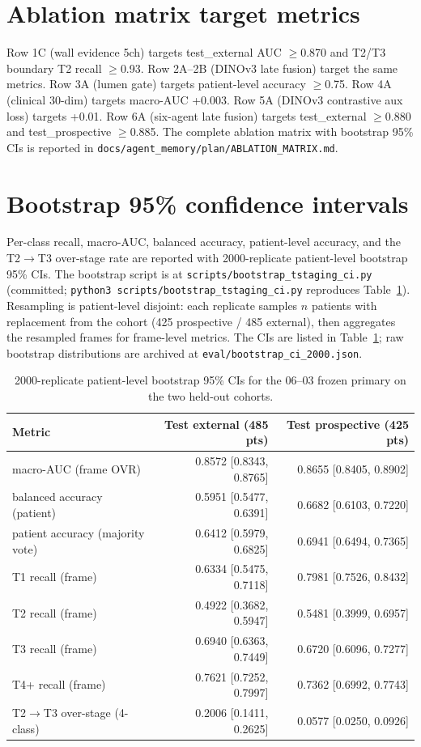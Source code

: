 \documentclass[11pt,a4paper]{article}
\begin{document}
\section{Ablation matrix target metrics}
\label{app:ablation}
Row 1C (wall evidence 5ch) targets test\_external AUC $\geq$0.870 and T2/T3 boundary T2 recall $\geq$0.93. Row 2A--2B (DINOv3 late fusion) target the same metrics. Row 3A (lumen gate) targets patient-level accuracy $\geq$0.75. Row 4A (clinical 30-dim) targets macro-AUC +0.003. Row 5A (DINOv3 contrastive aux loss) targets +0.01. Row 6A (six-agent late fusion) targets test\_external $\geq$0.880 and test\_prospective $\geq$0.885. The complete ablation matrix with bootstrap 95\% CIs is reported in \texttt{docs/agent\_memory/plan/ABLATION\_MATRIX.md}.

\section{Bootstrap 95\% confidence intervals}
\label{app:bootstrap}
Per-class recall, macro-AUC, balanced accuracy, patient-level accuracy, and the T2$\to$T3 over-stage rate are reported with 2000-replicate patient-level bootstrap 95\% CIs. The bootstrap script is at \texttt{scripts/bootstrap\_tstaging\_ci.py} (committed; \texttt{python3 scripts/bootstrap\_tstaging\_ci.py} reproduces Table~\ref{tab:ci}). Resampling is patient-level disjoint: each replicate samples $n$ patients with replacement from the cohort (425 prospective / 485 external), then aggregates the resampled frames for frame-level metrics. The CIs are listed in Table~\ref{tab:ci}; raw bootstrap distributions are archived at \texttt{eval/bootstrap\_ci\_2000.json}.

\begin{table}[h]
\caption{2000-replicate patient-level bootstrap 95\% CIs for the 06--03 frozen primary on the two held-out cohorts.}
\label{tab:ci}
\centering
\begin{tabular}{lrr}
\toprule
\textbf{Metric} & \textbf{Test external (485 pts)} & \textbf{Test prospective (425 pts)} \\
\midrule
macro-AUC (frame OVR)            & 0.8572 [0.8343, 0.8765] & 0.8655 [0.8405, 0.8902] \\
balanced accuracy (patient)      & 0.5951 [0.5477, 0.6391] & 0.6682 [0.6103, 0.7220] \\
patient accuracy (majority vote) & 0.6412 [0.5979, 0.6825] & 0.6941 [0.6494, 0.7365] \\
T1 recall (frame)                & 0.6334 [0.5475, 0.7118] & 0.7981 [0.7526, 0.8432] \\
T2 recall (frame)                & 0.4922 [0.3682, 0.5947] & 0.5481 [0.3999, 0.6957] \\
T3 recall (frame)                & 0.6940 [0.6363, 0.7449] & 0.6720 [0.6096, 0.7277] \\
T4+ recall (frame)               & 0.7621 [0.7252, 0.7997] & 0.7362 [0.6992, 0.7743] \\
T2$\to$T3 over-stage (4-class)   & 0.2006 [0.1411, 0.2625] & 0.0577 [0.0250, 0.0926] \\
\bottomrule
\end{tabular}
\end{table}
\end{document}

